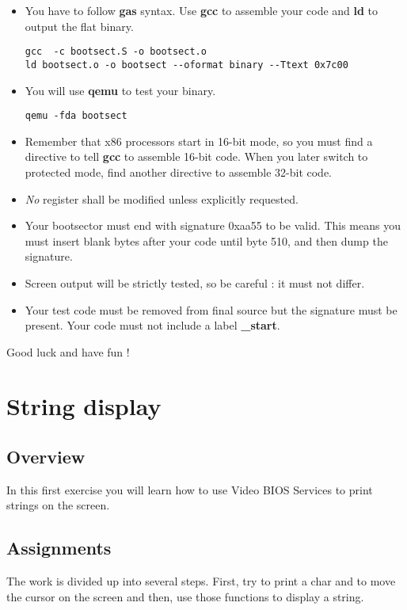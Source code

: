 \begin{itemize}
\item
  You have to follow \textbf{gas} syntax. Use \textbf{gcc} to assemble your
  code and \textbf{ld} to output the flat binary.
  \begin{verbatim}
gcc  -c bootsect.S -o bootsect.o
ld bootsect.o -o bootsect --oformat binary --Ttext 0x7c00
  \end{verbatim}
\item
  You will use \textbf{qemu} to test your binary.
  \begin{verbatim}
qemu -fda bootsect
  \end{verbatim}
\item
  Remember that x86 processors start in 16-bit mode, so you must find a
  directive to tell \textbf{gcc} to assemble 16-bit code. When you later
  switch to protected mode, find another directive to assemble 32-bit code.
\item
  \emph{No} register shall be modified unless explicitly requested.
\item
  Your bootsector must end with signature 0xaa55 to be valid. This means you
  must insert blank bytes after your code until byte 510, and then dump
  the signature.
\item
  Screen output will be strictly tested, so be careful : it must not
  differ.
\item
  Your test code must be removed from final source but the signature must be
  present. Your code must not include a label \textbf{\_start}.
\end{itemize}

Good luck and have fun !

%
%

\newpage

\section{String display}

\subsection*{Overview}
In this first exercise you will learn how to use Video BIOS Services to
print strings on the screen.

\subsection*{Assignments}
The work is divided up into several steps. First, try to print a char and
to move the cursor on the screen and then, use those functions to display
a string.


